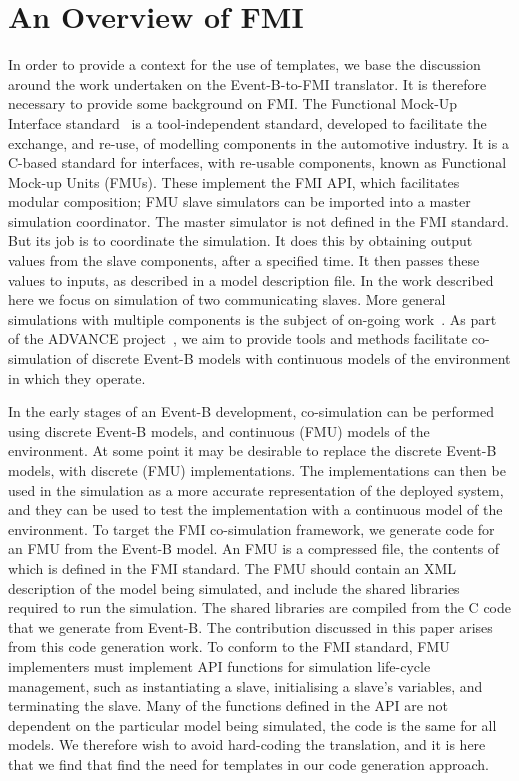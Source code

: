 \documentclass{llncs}%
\begin{document}
\section{An Overview of FMI}\label{FMI}
%
In order to provide a context for the use of templates, we base the discussion around the work undertaken on the Event-B-to-FMI translator. It is therefore necessary to provide some background on FMI. The Functional Mock-Up Interface standard~\cite{bloch2012,bloch2011,FMISTD} is a tool-independent standard, developed to facilitate the exchange, and re-use, of modelling components in the automotive industry. It is a C-based standard for interfaces, with re-usable components, known as Functional Mock-up Units (FMUs). These implement the FMI API, which facilitates modular composition; FMU slave simulators can be imported into a master simulation coordinator. The master simulator is not defined in the FMI standard. But its job is to coordinate the simulation. It does this by obtaining output values from the slave components, after a specified time. It then passes these values to inputs, as described in a model description file. In the work described here we focus on simulation of two communicating slaves.  More general simulations with multiple components is the subject of on-going work~\cite{eps360400}. As part of the ADVANCE project~\cite{advance}, we aim to provide tools and methods facilitate co-simulation of discrete Event-B models with continuous models of the environment in which they operate. 

In the early stages of an Event-B development, co-simulation can be performed using discrete Event-B models, and continuous (FMU) models of the environment. At some point it may be desirable to replace the discrete Event-B models, with discrete (FMU) implementations. The implementations can then be used in the simulation as a more accurate representation of the deployed system, and they can be used to test the implementation with a continuous model of the environment. To target the FMI co-simulation framework, we generate code for an FMU from the Event-B model. An FMU is a compressed file, the contents of which is defined in the FMI standard. The FMU should contain an XML description of the model being simulated, and include the shared libraries required to run the simulation. The shared libraries are compiled from the C code that we generate from Event-B. The contribution discussed in this paper arises from this code generation work. To conform to the FMI standard, FMU implementers must implement API functions for simulation life-cycle management, such as instantiating a slave, initialising a slave's variables, and terminating the slave. Many of the functions defined in the API are not dependent on the particular model being simulated, the code is the same for all models. We therefore wish to avoid hard-coding the translation, and it is here that we find that find the need for templates in our code generation approach.   
\end{document}
